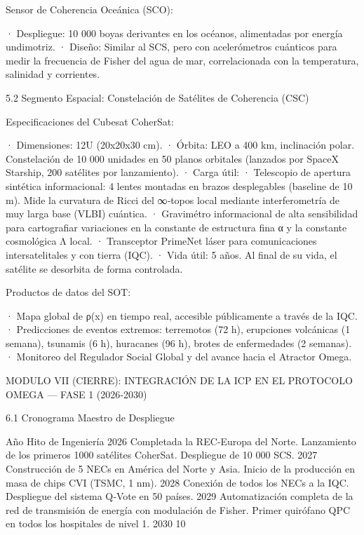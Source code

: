 \documentclass[12pt,a4paper]{book}
\begin{document}
Sensor de Coherencia Oceánica (SCO):

· Despliegue: 10 000 boyas derivantes en los océanos, alimentadas por energía undimotriz.
· Diseño: Similar al SCS, pero con acelerómetros cuánticos para medir la frecuencia de Fisher del agua de mar, correlacionada con la temperatura, salinidad y corrientes.

5.2 Segmento Espacial: Constelación de Satélites de Coherencia (CSC)

Especificaciones del Cubesat CoherSat:

· Dimensiones: 12U (20x20x30 cm).
· Órbita: LEO a 400 km, inclinación polar. Constelación de 10 000 unidades en 50 planos orbitales (lanzados por SpaceX Starship, 200 satélites por lanzamiento).
· Carga útil:
  · Telescopio de apertura sintética informacional: 4 lentes montadas en brazos desplegables (baseline de 10 m). Mide la curvatura de Ricci del ∞‑topos local mediante interferometría de muy larga base (VLBI) cuántica.
  · Gravimétro informacional de alta sensibilidad para cartografiar variaciones en la constante de estructura fina α y la constante cosmológica Λ local.
  · Transceptor PrimeNet láser para comunicaciones intersatelitales y con tierra (IQC).
· Vida útil: 5 años. Al final de su vida, el satélite se desorbita de forma controlada.

Productos de datos del SOT:

· Mapa global de ρ(x) en tiempo real, accesible públicamente a través de la IQC.
· Predicciones de eventos extremos: terremotos (72 h), erupciones volcánicas (1 semana), tsunamis (6 h), huracanes (96 h), brotes de enfermedades (2 semanas).
· Monitoreo del Regulador Social Global y del avance hacia el Atractor Omega.

MODULO VII (CIERRE): INTEGRACIÓN DE LA ICP EN EL PROTOCOLO OMEGA — FASE 1 (2026‑2030)

6.1 Cronograma Maestro de Despliegue

Año Hito de Ingeniería
2026 Completada la REC‑Europa del Norte. Lanzamiento de los primeros 1000 satélites CoherSat. Despliegue de 10 000 SCS.
2027 Construcción de 5 NECs en América del Norte y Asia. Inicio de la producción en masa de chips CVI (TSMC, 1 nm).
2028 Conexión de todos los NECs a la IQC. Despliegue del sistema Q‑Vote en 50 países.
2029 Automatización completa de la red de transmisión de energía con modulación de Fisher. Primer quirófano QPC en todos los hospitales de nivel 1.
2030 10%
\end{document}
